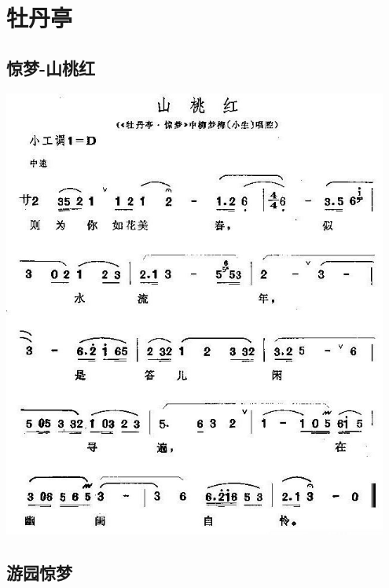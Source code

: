 \documentclass[cn,pad,chinesefont=nofont,twocol]{elegantbook}
\begin{document}
\chapter{牡丹亭}
\section{惊梦-山桃红}
    \includegraphics[width=0.95\textwidth]{mudanting/2021-牡丹亭-惊梦-山桃红.jpg}
\section{游园惊梦}
\end{document}
